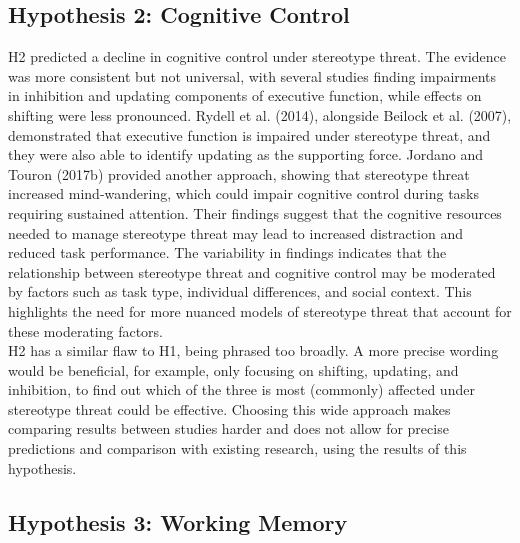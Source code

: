 \documentclass[
  stu, a4paper, 12pt,mask,floatsintext]{apa7}
\begin{document}
\subsection{Hypothesis 2: Cognitive Control}\label{hypothesis-2-cognitive-control}

H2 predicted a decline in cognitive control under stereotype threat.
The evidence was more consistent but not universal, with several studies finding impairments in inhibition and updating components of executive function, while effects on shifting were less pronounced.
Rydell et al. (2014), alongside Beilock et al. (2007), demonstrated that executive function is impaired under stereotype threat, and they were also able to identify updating as the supporting force.
Jordano and Touron (2017b) provided another approach, showing that stereotype threat increased mind-wandering, which could impair cognitive control during tasks requiring sustained attention.
Their findings suggest that the cognitive resources needed to manage stereotype threat may lead to increased distraction and reduced task performance.
The variability in findings indicates that the relationship between stereotype threat and cognitive control may be moderated by factors such as task type, individual differences, and social context.
This highlights the need for more nuanced models of stereotype threat that account for these moderating factors.\\
H2 has a similar flaw to H1, being phrased too broadly. A more precise wording would be beneficial, for example, only focusing on shifting, updating, and inhibition, to find out which of the three is most (commonly) affected under stereotype threat could be effective.
Choosing this wide approach makes comparing results between studies harder and does not allow for precise predictions and comparison with existing research, using the results of this hypothesis.

\subsection{Hypothesis 3: Working Memory}\label{hypothesis-3-working-memory}
\end{document}
